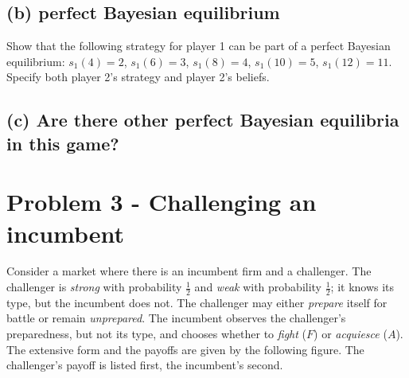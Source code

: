 \documentclass{article}
\begin{document}
\subsection{(b) perfect Bayesian
equilibrium} Show that the following strategy for player 1 can be part of a perfect Bayesian
equilibrium: $s_1(4) = 2$, $s_1(6) = 3$, $s_1(8) = 4$, $s_1(10) = 5$, $s_1(12) = 11$. Specify
both player 2's strategy and player 2's beliefs. 
%
\subsection{(c) Are there other perfect Bayesian equilibria in this game?} %


\bigskip

\section{Problem 3 - Challenging an incumbent}

Consider a market where there is an incumbent firm and a challenger. The challenger is
\textit{strong} with probability $\tfrac12$ and \textit{weak} with probability $\tfrac12$; it knows its type, but the incumbent
does not. The challenger may either \textit{prepare} itself for battle or remain \textit{unprepared}. The
incumbent observes the challenger's preparedness, but not its type, and chooses whether to
\textit{fight} ($F$) or \textit{acquiesce} ($A$). The extensive form and the payoffs are given by the following
figure. The challenger's payoff is listed first, the incumbent's second.


\bigskip
\end{document}
